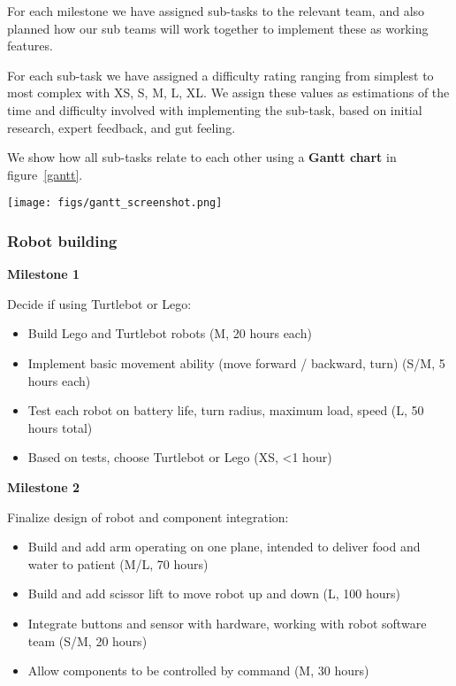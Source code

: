 \documentclass{article}
\begin{document}
For each milestone we have assigned sub-tasks to the relevant team, and also planned how our sub teams will work together to implement these as working features.

For each sub-task we have assigned a difficulty rating ranging from simplest to most complex with XS, S, M, L, XL. We assign these values as estimations of the time and difficulty involved with implementing the sub-task, based on initial research, expert feedback, and gut feeling. 

We show how all sub-tasks relate to each other using a {\bf Gantt chart} in figure~\ref{gantt}.

\begin{figure*}
  \texttt{[image: figs/gantt\_screenshot.png]}
  \caption{Gantt chart representing dependencies between tasks and flow of tasks over time. Due to limitations in text width, tasks are represented using the shortened versions mentioned in tables~\ref{tab:rb-rd}, ~\ref{tab:rp-rd}, and ~\ref{tab:app-rd}. Milestone dates track to the Wednesday of the demo date rather than the Sunday: work on features for a milestone is expected to finish on the Sunday but work on new features will not begin until Monday.  }
  \label{gantt}
\end{figure*}

\subsubsection{Robot building}
{\bf Milestone 1}

Decide if using Turtlebot or Lego:
\begin{itemize}
\item Build Lego and Turtlebot robots (M, 20 hours each)
\item Implement basic movement ability (move forward / backward, turn) (S/M, 5 hours each)
\item Test each robot on battery life, turn radius, maximum load, speed (L, 50 hours total)
\item Based on tests, choose Turtlebot or Lego (XS, <1 hour)
\end{itemize}

{\bf Milestone 2}

Finalize design of robot and component integration:
\begin{itemize}
\item Build and add arm operating on one plane, intended to deliver food and water to patient (M/L, 70 hours)
\item Build and add scissor lift to move robot up and down (L, 100 hours)
\item Integrate buttons and sensor with hardware, working with robot software team (S/M, 20 hours)
\item Allow components to be controlled by command (M, 30 hours)
\end{itemize}
\end{document}

